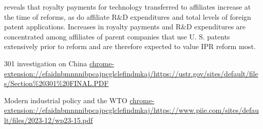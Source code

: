 \documentclass[10pt]{article} %
\begin{document}
\cite{BranstetterFismanFoley2006} reveals that royalty payments for technology transferred to affiliates increase at the time of reforms, as do affiliate R\&D expenditures and total levels of foreign patent applications. Increases in royalty payments and R\&D expenditures are concentrated among affiliates of parent companies that use U. S. patents extensively prior to reform and are therefore expected to value IPR reform most.





301 investigation on China \url{chrome-extension://efaidnbmnnnibpcajpcglclefindmkaj/https://ustr.gov/sites/default/files/Section%20301%20FINAL.PDF}

Modern industrial policy and the WTO \url{chrome-extension://efaidnbmnnnibpcajpcglclefindmkaj/https://www.piie.com/sites/default/files/2023-12/wp23-15.pdf}

\newpage
\footnotesize


\end{document}
